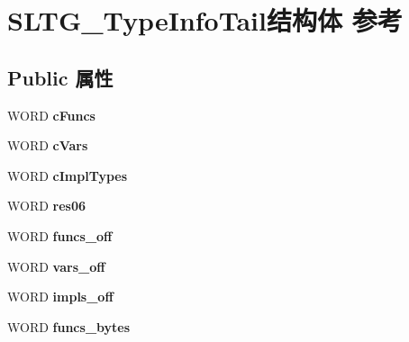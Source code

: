\hypertarget{struct_s_l_t_g___type_info_tail}{}\section{S\+L\+T\+G\+\_\+\+Type\+Info\+Tail结构体 参考}
\label{struct_s_l_t_g___type_info_tail}
\subsection*{Public 属性}
\begin{DoxyCompactItemize}
\item 
\mbox{\label{struct_s_l_t_g___type_info_tail_a2e27f527d61b2c4763275a44993130a7}} 
W\+O\+RD {\bfseries c\+Funcs}
\item 
\mbox{\label{struct_s_l_t_g___type_info_tail_a216228adfd04a4b800f22ec249b9da52}} 
W\+O\+RD {\bfseries c\+Vars}
\item 
\mbox{\label{struct_s_l_t_g___type_info_tail_aebfb065b4e0f4d8c9f46853be32a4424}} 
W\+O\+RD {\bfseries c\+Impl\+Types}
\item 
\mbox{\label{struct_s_l_t_g___type_info_tail_a0969679f5c5c8ffbd503cc01c1b63abb}} 
W\+O\+RD {\bfseries res06}
\item 
\mbox{\label{struct_s_l_t_g___type_info_tail_acc82ad818fcd5f370573a2091360d855}} 
W\+O\+RD {\bfseries funcs\+\_\+off}
\item 
\mbox{\label{struct_s_l_t_g___type_info_tail_aa900d7e585321222c481d7020ea85c0e}} 
W\+O\+RD {\bfseries vars\+\_\+off}
\item 
\mbox{\label{struct_s_l_t_g___type_info_tail_aa72688ac464f066bbe33c1fd0e352b3f}} 
W\+O\+RD {\bfseries impls\+\_\+off}
\item 
\mbox{\label{struct_s_l_t_g___type_info_tail_adaf72e6306fc375d3f16f8b1ff33882a}} 
W\+O\+RD {\bfseries funcs\+\_\+bytes}
\item 

\end{DoxyCompactItemize}
